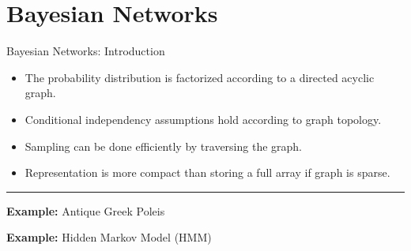 \section{Bayesian Networks}

\begin{frame}{Bayesian Networks: Introduction}
    \begin{itemize}
        \item The probability distribution is factorized according to a directed acyclic graph.
        \pause \item Conditional independency assumptions hold according to graph topology.
        \pause \item Sampling can be done efficiently by traversing the graph.
        \pause \item Representation is more compact than storing a full array if graph is sparse.
    \end{itemize}
        \pause
        \hrule
        \begin{minipage}[t]{0.49\textwidth}
        \textbf{Example:} Antique Greek Poleis
        \begin{center}
    \end{center}
\end{minipage}
    \pause
    \hfill\vrule\hfill
        \begin{minipage}[t]{0.49\textwidth}
            \textbf{Example:} Hidden Markov Model (HMM)
            \begin{center}
\end{center}
\end{minipage}
\end{frame}
